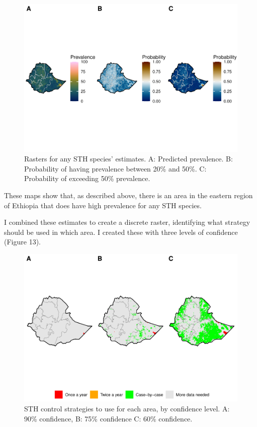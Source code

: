 \documentclass[
]{article}
\begin{document}
\begin{figure}
\centering
\includegraphics{write_up_files/figure-latex/any.sth.prediction.rasters-1.pdf}
\caption{Rasters for any STH species' estimates. A: Predicted
prevalence. B: Probability of having prevalence between 20\% and 50\%.
C: Probability of exceeding 50\% prevalence.}
\end{figure}

These maps show that, as described above, there is an area in the
eastern region of Ethiopia that does have high prevalence for any STH
species.

I combined these estimates to create a discrete raster, identifying what
strategy should be used in which area. I created these with three levels
of confidence (Figure 13).

\begin{figure}
\centering
\includegraphics{write_up_files/figure-latex/discrete.rasters-1.pdf}
\caption{STH control strategies to use for each area, by confidence
level. A: 90\% confidence, B: 75\% confidence C: 60\% confidence.}
\end{figure}
\end{document}
